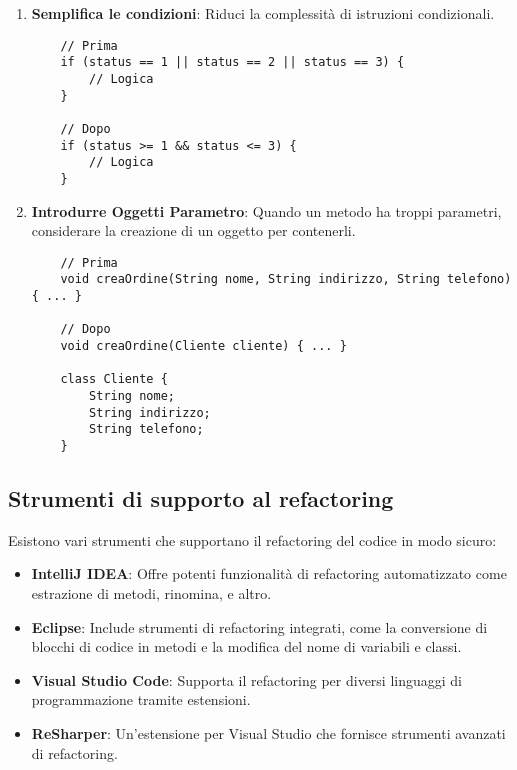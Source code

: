 \documentclass{article}
\begin{document}
\begin{enumerate}
    \item \textbf{Semplifica le condizioni}:
    Riduci la complessità di istruzioni condizionali.
    \begin{lstlisting}
    // Prima
    if (status == 1 || status == 2 || status == 3) {
        // Logica
    }
    
    // Dopo
    if (status >= 1 && status <= 3) {
        // Logica
    }
    \end{lstlisting}

    \item \textbf{Introdurre Oggetti Parametro}:
    Quando un metodo ha troppi parametri, considerare la creazione di un oggetto per contenerli.
    \begin{lstlisting}
    // Prima
    void creaOrdine(String nome, String indirizzo, String telefono) { ... }
    
    // Dopo
    void creaOrdine(Cliente cliente) { ... }
    
    class Cliente {
        String nome;
        String indirizzo;
        String telefono;
    }
    \end{lstlisting}
\end{enumerate}

\subsection{Strumenti di supporto al refactoring}
Esistono vari strumenti che supportano il refactoring del codice in modo sicuro:
\begin{itemize}
    \item \textbf{IntelliJ IDEA}: Offre potenti funzionalità di refactoring automatizzato come estrazione di metodi, rinomina, e altro.
    \item \textbf{Eclipse}: Include strumenti di refactoring integrati, come la conversione di blocchi di codice in metodi e la modifica del nome di variabili e classi.
    \item \textbf{Visual Studio Code}: Supporta il refactoring per diversi linguaggi di programmazione tramite estensioni.
    \item \textbf{ReSharper}: Un'estensione per Visual Studio che fornisce strumenti avanzati di refactoring.
\end{itemize}
\end{document}
